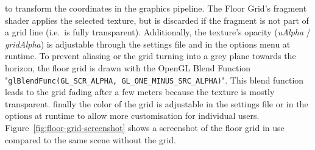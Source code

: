 to transform the coordinates in the graphics pipeline.
The Floor Grid's fragment shader applies the selected texture, but is discarded if the fragment is not part of a grid
line (i.e.\ is fully transparent).
Additionally, the texture's opacity (\textit{uAlpha} / \textit{gridAlpha}) is adjustable through the settings file and
in the options menu at runtime.
To prevent aliasing or the grid turning into a grey plane towards the horizon, the floor grid is drawn with the
OpenGL Blend Function "\texttt{glBlendFunc(GL_SCR_ALPHA, GL_ONE_MINUS_SRC_ALPHA)}".
This blend function leads to the grid fading after a few meters because the texture is mostly transparent.
finally the color of the grid is adjustable in the settings file or in the options at runtime to allow more
customisation for individual users.
Figure~\ref{fig:floor-grid-screenshot} shows a screenshot of the floor grid in use compared to the same scene without
the grid.
